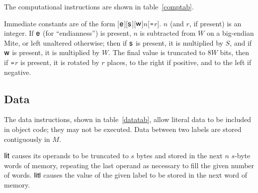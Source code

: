 \documentclass[english]{scrartcl}
\newcommand{\synfont}{\sffamily}
\newcommand{\syn}[1]{\ensuremath{\text{\synfont #1}}}
\newcommand{\insttab}[2]{\ctable[caption=#1]{>{\synfont}p{13ex}p{44ex}}{}{\FL #2\bottomrule}}
\begin{document}
\insttab{Computational instructions\label{comptab}}{}

The computational instructions are shown in table~\ref{comptab}.

Immediate constants are of the form
[\syn{e}][\syn{s}][\syn{w}]$n$[\syn{\textgreater\textgreater}$r$]. $n$ (and $r$, if
present) is an integer. If \syn{e} (for ``endianness'') is present,
$n$ is subtracted from $W$ on a big-endian Mite, or left unaltered
otherwise; then if \syn{s} is present, it is multiplied by $S$, and if
\syn{w} is present, it is multiplied by $W$. The final value is
truncated to $8W$ bits, then if \syn{\textgreater\textgreater}$r$ is present, it is
rotated by $r$ places, to the right if positive, and to the left if
negative.


\subsection{Data}

The data instructions, shown in table~\ref{datatab}, allow literal
data to be included in object code; they may not be executed. Data
between two labels are stored contiguously in $M$.

\insttab{Data instructions\label{datatab}}{}

\syn{lit} causes its operands to be truncated to $s$ bytes and stored
in the next $n$ $s$-byte words of memory, repeating the last operand
as necessary to fill the given number of words. \syn{litl} causes the
value of the given label to be stored in the next word of memory.







\end{document}
